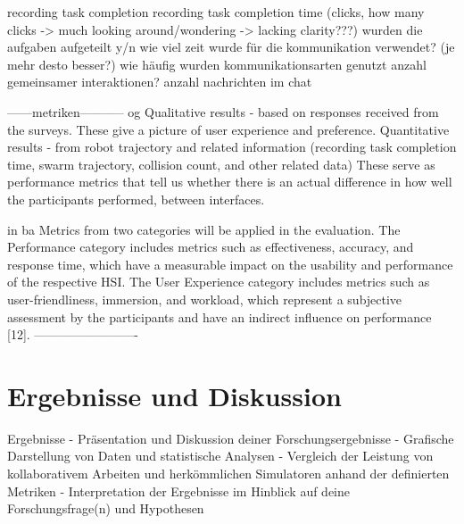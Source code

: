 \documentclass[german,version-2020-11]{uzl-thesis}
\begin{document}
            recording task completion  
            recording task completion time
            (clicks, how many clicks -> much looking around/wondering -> lacking clarity???)
            wurden die aufgaben aufgeteilt y/n
            wie viel zeit wurde für die kommunikation verwendet? (je mehr desto besser?)
            wie häufig wurden kommunikationsarten genutzt
            anzahl gemeinsamer interaktionen? anzahl nachrichten im chat
            
            
      
      ------metriken-----------
        og
        Qualitative results - based on responses received from the surveys. 
          These give a picture of user experience and preference. 
        Quantitative results - from robot trajectory and related information 
          (recording task completion time, swarm trajectory, collision count, and other related data)
          These serve as performance metrics that tell us whether there is an actual difference in how well 
          the participants performed, between interfaces. 
          
      
      
        in ba
        Metrics from two categories will be applied in the evaluation. 
          The Performance category includes metrics such as effectiveness, accuracy, and response time, 
            which have a measurable impact on the usability and performance of the respective HSI. 
          The User Experience category includes metrics such as user-friendliness, immersion, and workload, 
            which represent a subjective assessment by the participants and have an indirect influence on performance [12].
      -------------------------
      



    
\section{Ergebnisse und Diskussion}





Ergebnisse
      - Präsentation und Diskussion deiner Forschungsergebnisse
      - Grafische Darstellung von Daten und statistische Analysen
      - Vergleich der Leistung von kollaborativem Arbeiten und herkömmlichen Simulatoren anhand der definierten Metriken
      - Interpretation der Ergebnisse im Hinblick auf deine Forschungsfrage(n) und Hypothesen
   
\end{document}
